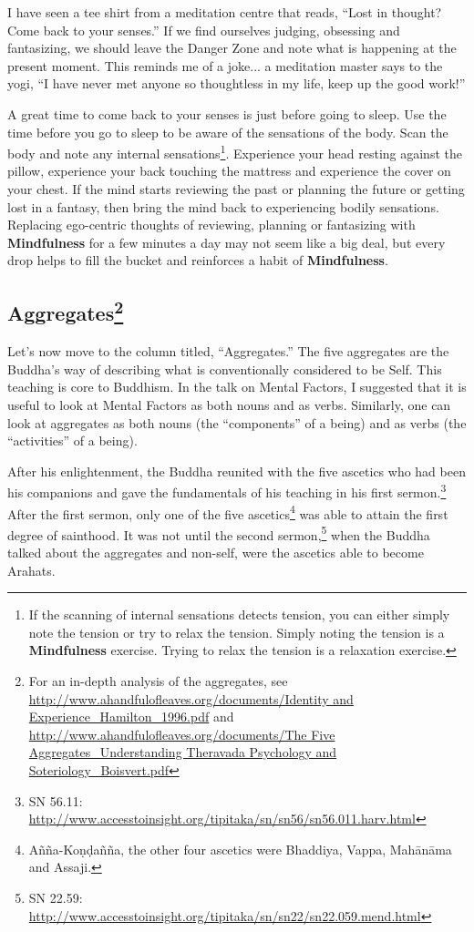 I have seen a tee shirt from a meditation centre that reads, “Lost in thought? Come back to your senses.” If we find ourselves judging, obsessing and fantasizing, we should leave the Danger Zone and note what is happening at the present moment. This reminds me of a joke... a meditation master says to the yogi, “I have never met anyone so thoughtless in my life, keep up the good work!”

A great time to come back to your senses is just before going to sleep. Use the time before you go to sleep to be aware of the sensations of the body. Scan the body and note any internal sensations\footnote{If the scanning of internal sensations detects tension, you can either simply note the tension or try to relax the tension. Simply noting the tension is a \textbf{Mindfulness} exercise. Trying to relax the tension is a relaxation exercise.}. Experience your head resting against the pillow, experience your back touching the mattress and experience the cover on your chest. If the mind starts reviewing the past or planning the future or getting lost in a fantasy, then bring the mind back to experiencing bodily sensations. Replacing ego-centric thoughts of reviewing, planning or fantasizing with \textbf{Mindfulness} for a few minutes a day may not seem like a big deal, but every drop helps to fill the bucket and reinforces a habit of \textbf{Mindfulness}.

\subsection*{Aggregates\footnote{For an in-depth analysis of the aggregates, see \url{http://www.ahandfulofleaves.org/documents/Identity and Experience_Hamilton_1996.pdf} and \url{http://www.ahandfulofleaves.org/documents/The Five Aggregates_Understanding Theravada Psychology and Soteriology_Boisvert.pdf}}}

Let’s now move to the column titled, “Aggregates.” The five aggregates are the Buddha’s way of describing what is conventionally considered to be Self. This teaching is core to Buddhism. In the talk on Mental Factors, I suggested that it is useful to look at Mental Factors as both nouns and as verbs. Similarly, one can look at aggregates as both nouns (the “components” of a being) and as verbs (the “activities” of a being).

After his enlightenment, the Buddha reunited with the five ascetics who had been his companions and gave the fundamentals of his teaching in his first sermon.\footnote{SN 56.11: \url{http://www.accesstoinsight.org/tipitaka/sn/sn56/sn56.011.harv.html}} After the first sermon, only one of the five ascetics\footnote{Añña-Koṇḍañña, the other four ascetics were Bhaddiya, Vappa, Mahānāma and Assaji.} was able to attain the first degree of sainthood. It was not until the second sermon,\footnote{SN 22.59: \url{http://www.accesstoinsight.org/tipitaka/sn/sn22/sn22.059.mend.html}} when the Buddha talked about the aggregates and non-self, were the ascetics able to become Arahats.

